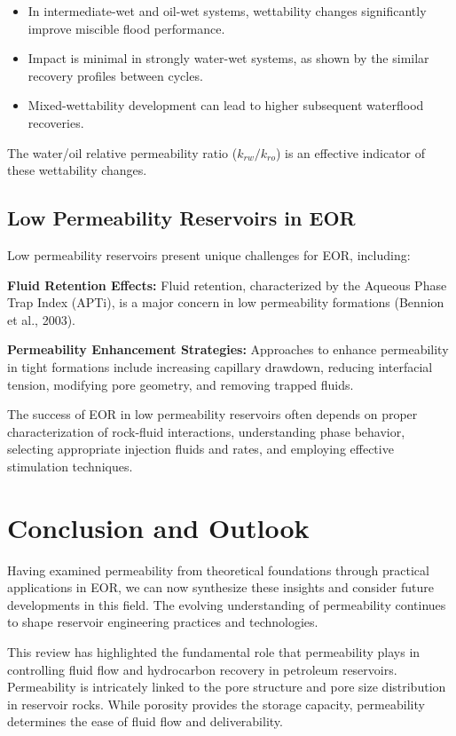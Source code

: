 \documentclass[journal]{IEEEtran}
\begin{document}
\begin{itemize}
    \item In intermediate-wet and oil-wet systems, wettability changes significantly improve miscible flood performance.
    \item Impact is minimal in strongly water-wet systems, as shown by the similar recovery profiles between cycles.
    \item Mixed-wettability development can lead to higher subsequent waterflood recoveries.
\end{itemize}

The water/oil relative permeability ratio ($k_{rw}/k_{ro}$) is an effective indicator of these wettability changes.

\subsection{Low Permeability Reservoirs in EOR}
Low permeability reservoirs present unique challenges for EOR, including:

\textbf{Fluid Retention Effects:} Fluid retention, characterized by the Aqueous Phase Trap Index (APTi), is a major concern in low permeability formations (Bennion et al., 2003).

\textbf{Permeability Enhancement Strategies:} Approaches to enhance permeability in tight formations include increasing capillary drawdown, reducing interfacial tension, modifying pore geometry, and removing trapped fluids.

The success of EOR in low permeability reservoirs often depends on proper characterization of rock-fluid interactions, understanding phase behavior, selecting appropriate injection fluids and rates, and employing effective stimulation techniques.

\section{Conclusion and Outlook}

Having examined permeability from theoretical foundations through practical applications in EOR, we can now synthesize these insights and consider future developments in this field. The evolving understanding of permeability continues to shape reservoir engineering practices and technologies.

This review has highlighted the fundamental role that permeability plays in controlling fluid flow and hydrocarbon recovery in petroleum reservoirs. Permeability is intricately linked to the pore structure and pore size distribution in reservoir rocks. While porosity provides the storage capacity, permeability determines the ease of fluid flow and deliverability.
\end{document}
